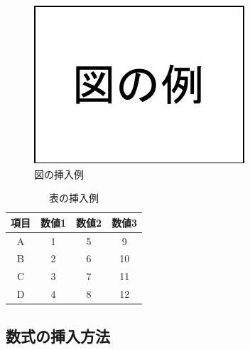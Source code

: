 \documentclass[a4j]{jsarticle}
\begin{document}
\begin{figure}[t]
  \centering
  \vspace{0pt} %
  \includegraphics[width=0.8\columnwidth]{image.pdf}
  \vspace{0pt} %
  \caption{図の挿入例}
  \vspace{0pt} %
  \label{fig:sample}
\end{figure}

\begin{table}[t]
  \centering
  \caption{表の挿入例}
  \label{table:sample}
  \vspace{0pt} %
  \begin{tabular}{|c|c|c|c|} \hline
    項目 & 数値1 & 数値2 & 数値3 \\ \hline
    A & 1 & 5 &  9 \\ \hline
    B & 2 & 6 & 10 \\ \hline
    C & 3 & 7 & 11 \\ \hline
    D & 4 & 8 & 12 \\ \hline
  \end{tabular}
  \vspace{10pt} %
\end{table}

\subsection{数式の挿入方法}
\end{document}
